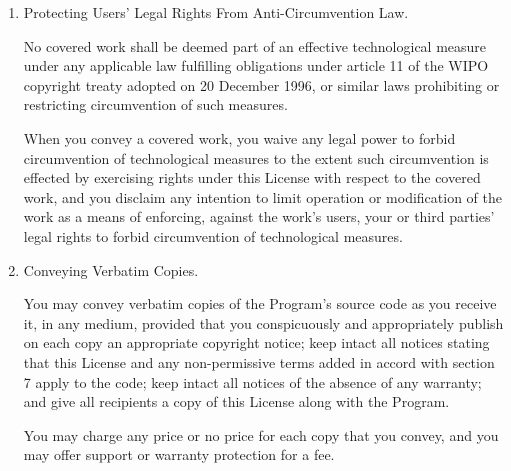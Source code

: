 \documentclass[11pt]{article}
\begin{document}
\begin{enumerate}
You may make, run and propagate covered works that you do not
convey, without conditions so long as your license otherwise remains
in force.  You may convey covered works to others for the sole purpose
of having them make modifications exclusively for you, or provide you
with facilities for running those works, provided that you comply with
the terms of this License in conveying all material for which you do
not control copyright.  Those thus making or running the covered works
for you must do so exclusively on your behalf, under your direction
and control, on terms that prohibit them from making any copies of
your copyrighted material outside their relationship with you.

Conveying under any other circumstances is permitted solely under
the conditions stated below.  Sublicensing is not allowed; section 10
makes it unnecessary.

\item Protecting Users' Legal Rights From Anti-Circumvention Law.

No covered work shall be deemed part of an effective technological
measure under any applicable law fulfilling obligations under article
11 of the WIPO copyright treaty adopted on 20 December 1996, or
similar laws prohibiting or restricting circumvention of such
measures.

When you convey a covered work, you waive any legal power to forbid
circumvention of technological measures to the extent such circumvention
is effected by exercising rights under this License with respect to
the covered work, and you disclaim any intention to limit operation or
modification of the work as a means of enforcing, against the work's
users, your or third parties' legal rights to forbid circumvention of
technological measures.

\item Conveying Verbatim Copies.

You may convey verbatim copies of the Program's source code as you
receive it, in any medium, provided that you conspicuously and
appropriately publish on each copy an appropriate copyright notice;
keep intact all notices stating that this License and any
non-permissive terms added in accord with section 7 apply to the code;
keep intact all notices of the absence of any warranty; and give all
recipients a copy of this License along with the Program.

You may charge any price or no price for each copy that you convey,
and you may offer support or warranty protection for a fee.


\end{enumerate}
\end{document}
